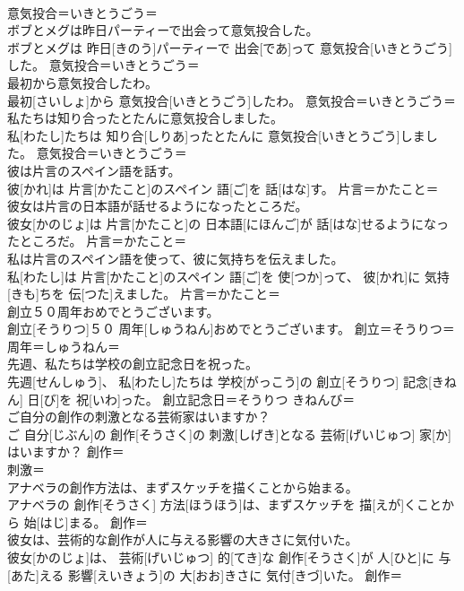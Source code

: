 \documentclass[8pt]{extreport}
\begin{document}
\begin{CJK}{UTF8}{min}
\\	意気投合＝いきとうごう＝ 
\\	ボブとメグは昨日パーティーで出会って意気投合した。	
\\	ボブとメグは 昨日[きのう]パーティーで 出会[であ]って 意気投合[いきとうごう]した。	意気投合＝いきとうごう＝ 
\\	最初から意気投合したわ。	
\\	最初[さいしょ]から 意気投合[いきとうごう]したわ。	意気投合＝いきとうごう＝ 
\\	私たちは知り合ったとたんに意気投合しました。	
\\	私[わたし]たちは 知り合[しりあ]ったとたんに 意気投合[いきとうごう]しました。	意気投合＝いきとうごう＝ 
\\	彼は片言のスペイン語を話す。	
\\	彼[かれ]は 片言[かたこと]のスペイン 語[ご]を 話[はな]す。	片言＝かたこと＝ 
\\	彼女は片言の日本語が話せるようになったところだ。	
\\	彼女[かのじょ]は 片言[かたこと]の 日本語[にほんご]が 話[はな]せるようになったところだ。	片言＝かたこと＝ 
\\	私は片言のスペイン語を使って、彼に気持ちを伝えました。	
\\	私[わたし]は 片言[かたこと]のスペイン 語[ご]を 使[つか]って、 彼[かれ]に 気持[きも]ちを 伝[つた]えました。	片言＝かたこと＝ 
\\	創立５０周年おめでとうございます。	
\\	創立[そうりつ]５０ 周年[しゅうねん]おめでとうございます。	創立＝そうりつ＝ 
\\	周年＝しゅうねん＝ 
\\	先週、私たちは学校の創立記念日を祝った。	
\\	先週[せんしゅう]、 私[わたし]たちは 学校[がっこう]の 創立[そうりつ] 記念[きねん] 日[び]を 祝[いわ]った。	創立記念日＝そうりつ きねんび＝ 
\\	ご自分の創作の刺激となる芸術家はいますか？	
\\	ご 自分[じぶん]の 創作[そうさく]の 刺激[しげき]となる 芸術[げいじゅつ] 家[か]はいますか？	創作＝ 
\\	刺激＝ 
\\	アナベラの創作方法は、まずスケッチを描くことから始まる。	
\\	アナベラの 創作[そうさく] 方法[ほうほう]は、まずスケッチを 描[えが]くことから 始[はじ]まる。	創作＝ 
\\	彼女は、芸術的な創作が人に与える影響の大きさに気付いた。	
\\	彼女[かのじょ]は、 芸術[げいじゅつ] 的[てき]な 創作[そうさく]が 人[ひと]に 与[あた]える 影響[えいきょう]の 大[おお]きさに 気付[きづ]いた。	創作＝ 

\end{CJK}
\end{document}
